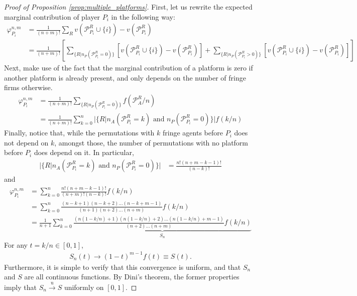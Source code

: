 \documentclass[a4paper]{article}
\begin{document}
\begin{proof}[Proof of Proposition \ref{prop:multiple_platforms}]
    \label{prop:one_sided_multiple}
    First, let us rewrite the expected marginal contribution of player $P_i$ in the following way:
    \begin{align*}
        \varphi_{P_i}^{n, m} &= \frac{1}{(n+m)!} \sum_R v(\mathcal{P}_{P_i}^R \cup \{i\}) - v(\mathcal{P}_{P_i}^R) \\
        &= \frac{1}{(n+m)!} \left[ \sum_{\{R | n_P(\mathcal{P}_{P_i}^R = 0)\}} \left[v(\mathcal{P}_{P_i}^R \cup \{i\}) - v(\mathcal{P}_{P_i}^R)\right] + \sum_{\{R | n_P(\mathcal{P}_{P_i}^R > 0)\}} \left[v(\mathcal{P}_{P_i}^R \cup \{i\}) - v(\mathcal{P}_{P_i}^R)\right] \right]
    \end{align*}
    Next, make use of the fact that the marginal contribution of a platform is zero if another platform is already present, and only depends on the number of fringe firms otherwise.
    \begin{align*}
        \varphi_{P_i}^{n, m} &= \frac{1}{(n+m)!} \sum_{\{R | n_P(\mathcal{P}_{P_i}^R = 0)\}} f (\mathcal{P}_{A}^R / n) \\
        &= \frac{1}{(n+m)!} \sum_{k=0}^n |\{R | n_A(\mathcal{P}^R_{P_i} = k) \text{ and } n_P(\mathcal{P}^R_{P_i} = 0)\}| f(k/n)
    \end{align*}
    Finally, notice that, while the permutations with $k$ fringe agents before $P_i$ does not depend on $k$, amongst those, the number of permutations with no platform before $P_i$ does depend on it. In particular,
    \begin{align*}
        |\{R | n_A(\mathcal{P}^R_{P_i} = k) \text{ and } n_P(\mathcal{P}^R_{P_i} = 0)\}| &= \frac{n!(n+m-k-1)!}{(n-k)!}
    \end{align*}
    and
    \begin{align*}
        \varphi_{P_i}^{n, m} &= \sum_{k=0}^n \frac{n!(n+m-k-1)!}{(n+m)!(n-k)!} f(k/n) \\
        &= \sum_{k=0}^n \frac{(n-k+1)(n-k+2) \dots (n-k+m-1)}{(n+1)(n+2) \dots (n+m)} f(k/n) \\
        &= \frac{1}{n+1}\sum_{k=0}^n \underbrace{\frac{(n(1-k/n)+1)(n(1-k/n)+2) \dots (n(1-k/n)+m-1)}{(n+2) \dots (n+m)} f(k/n)}_{S_n}
    \end{align*}
    For any $t = k/n \in [0, 1]$, 
    \begin{align*}
        S_n(t) \to (1-t)^{m-1}f(t) \equiv S(t).
    \end{align*}
    Furthermore, it is simple to verify that this convergence is uniform, and that $S_n$ and $S$ are all continuous functions. By Dini's theorem, the former properties imply that $S_n \xrightarrow[]{\mathrm{u}} S$ uniformly on $[0, 1]$.


\end{proof}
\end{document}
